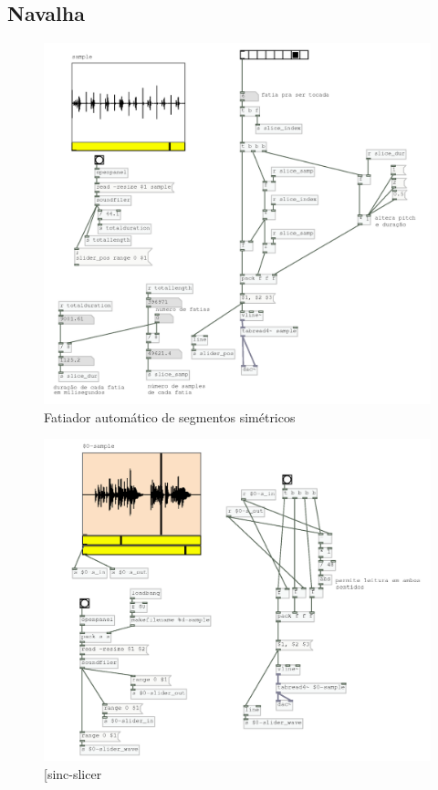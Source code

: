 \documentclass{ppgmus}
\begin{document}
\subsection {Navalha}

\begin{figure}[-h]
\includegraphics[scale=.2]{slicer3}
\caption{Fatiador automático de segmentos simétricos}
\label{slicer3}
\end{figure}

\begin{figure}[-h]
\includegraphics[scale=.6]{sinc-slicer}
\caption{[sinc-slicer}
\label{sinc-slicer}
\end{figure}
\end{document}
